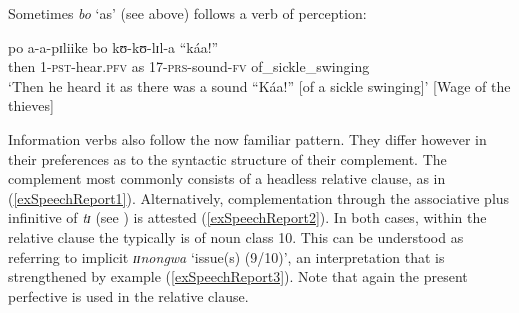Sometimes \textit{bo} \lq as' (see  above) follows a verb of perception:

\begin{exe}
\ex \label{exPRSparadigmsInComplementBo} \gll po a-a-pɪliike bo kʊ-kʊ-lɪl-a ``káa!''\\
then 1-\textsc{pst}-hear.\textsc{pfv} as 17-\textsc{prs}-sound-\textsc{fv} \phantom{\lq\lq}of\_sickle\_swinging\\
\glt `Then he heard it as there was a sound ``Káa!'' [of a sickle swinging]' [Wage of the thieves]
\end{exe}

Information verbs also follow the now familiar pattern. They differ however in their preferences as to the syntactic structure of their complement. The complement most commonly consists of a headless relative clause, as in (\ref{exSpeechReport1}). Alternatively, complementation through the associative plus infinitive of \textit{tɪ} (see ) is attested (\ref{exSpeechReport2}). In both cases, within the relative clause the  typically is of noun class 10. This can be understood as referring to implicit \textit{ɪɪnongwa} \lq issue(s) (9/10)', an interpretation that is strengthened by example (\ref{exSpeechReport3}). Note that again the present perfective is used in the relative clause.

